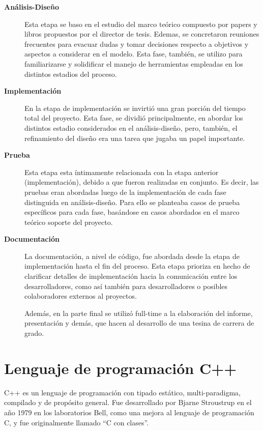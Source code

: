 \begin{description}
\item[\textbf{Análisis-Diseño}] Esta etapa se baso en el estudio del marco teórico compuesto por papers y libros propuestos por el director de tesis. Edemas, se concretaron reuniones frecuentes para evacuar dudas y tomar decisiones respecto a objetivos y aspectos a considerar en el modelo. Esta fase, también, se utilizo para familiarizarse y solidificar el manejo de herramientas empleadas en los distintos estadios del proceso. 

\item[\textbf{Implementación}] En la etapa de implementación se invirtió una gran porción del tiempo total del proyecto. Esta fase, se dividió principalmente, en abordar los distintos estadio considerados en el análisis-diseño, pero, también, el refinamiento del diseño era una tarea que jugaba un papel importante.

\item[\textbf{Prueba}] Esta etapa esta íntimamente relacionada con la etapa anterior (implementación), debido a que fueron realizadas en conjunto. Es decir, las pruebas eran abordadas luego de la implementación de cada fase distinguida en análisis-diseño. Para ello se planteaba casos de prueba específicos para cada fase, basándose en casos abordados en el marco teórico soporte del proyecto.

\item[\textbf{Documentación}] La documentación, a nivel de código, fue abordada desde la etapa de implementación hasta el fin del proceso. Esta etapa prioriza en hecho de clarificar detalles de implementación hacia la comunicación entre los desarrolladores, como así también para desarrolladores o posibles colaboradores externos al proyectos.

Además, en la parte final se utilizó full-time a la elaboración del informe, presentación y demás, que hacen al desarrollo de una tesina de carrera de grado.
\end{description}

\section{Lenguaje de programación C++}
C++ es un lenguaje de programación con tipado estático, multi-paradigma, compilado y de propósito general. Fue desarrollado por Bjarne Stroustrup en el año 1979 en los laboratorios Bell, como una mejora al lenguaje de programación C, y fue originalmente llamado ``C con clases''.


